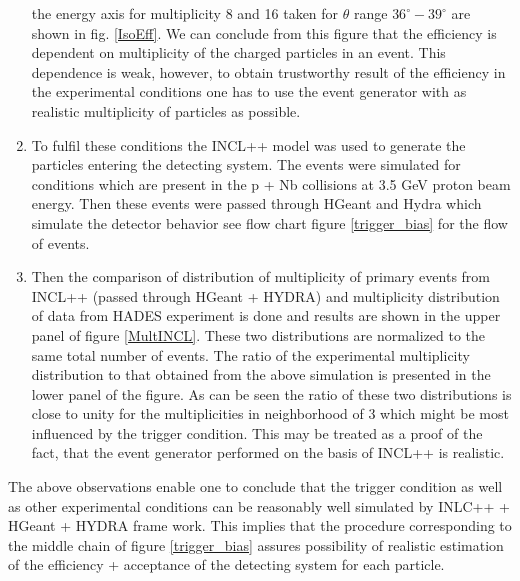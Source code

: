 \begin{enumerate}[label=\roman*)]
the energy axis for multiplicity 8 and 16 taken for $\theta$ range
$36^{\circ}-39^{\circ}$ are shown in fig. \ref{IsoEff}.  We can conclude
from this figure that the efficiency is dependent on multiplicity of
the charged particles in an event. This dependence is weak, however,
to obtain trustworthy result of the efficiency in the experimental
conditions one has to use the event generator with as realistic
multiplicity of particles as possible.
    \item To fulfil these conditions the INCL++ model was used to generate the
particles entering the detecting system.    The events were
simulated for conditions which are present in the p + Nb collisions
at 3.5 GeV proton beam energy. Then these events were passed through
HGeant and Hydra which simulate the detector behavior see flow chart
figure \ref{trigger_bias} for the flow of events.
%
    \item Then the comparison of distribution of  multiplicity of primary events
from  INCL++ (passed through HGeant + HYDRA) and multiplicity
distribution of data  from HADES experiment is done and results are
shown in the upper panel of figure \ref{MultINCL}. These two distributions are
normalized to the same total number of events. The ratio of the
experimental multiplicity distribution to that obtained from the
above simulation is presented in the lower panel of the figure. As
can be seen the ratio of these two distributions is close to unity
for the multiplicities in neighborhood of 3 which might be most
influenced by the trigger condition.    This may be treated as a
proof of the fact, that the event generator performed on the basis
of INCL++ is realistic.
\end{enumerate}
The above observations enable one to conclude that the trigger
condition as well as other experimental conditions can be reasonably
well simulated by INLC++ + HGeant + HYDRA frame work. This implies
that the procedure corresponding to the middle chain of figure \ref{trigger_bias} 
assures possibility of realistic estimation of the efficiency +
acceptance of the detecting system for each particle.

